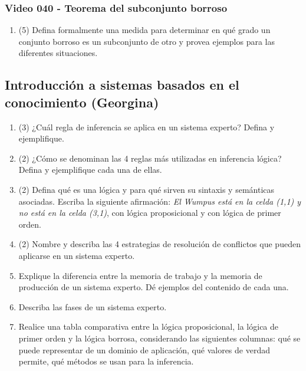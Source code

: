 \documentclass[a4paper,10pt,spanish,oneside]{article}
\begin{document}
\subsubsection{Video 040 - Teorema del subconjunto borroso}

\begin{enumerate}
\item (5) Defina formalmente una medida para determinar en qué grado un conjunto borroso es un subconjunto de otro y provea ejemplos para las diferentes situaciones.
\end{enumerate}

\newpage

\subsection{Introducción a sistemas basados en el conocimiento (Georgina)}

\begin{enumerate}
\item (3) ¿Cuál regla de inferencia se aplica en un sistema experto? Defina y ejemplifique.

\item (2) ¿Cómo se denominan las 4 reglas más utilizadas en inferencia lógica? Defina y ejemplifique cada una de ellas.

\item (2) Defina qué es una lógica y para qué sirven su sintaxis y semánticas asociadas. Escriba la siguiente afirmación: \textit{El Wumpus está en la celda (1,1) y no está en la celda (3,1)}, con lógica proposicional y con lógica de primer orden.

\item (2) Nombre y describa las 4 estrategias de resolución de conflictos que pueden aplicarse en un sistema experto.

\item Explique la diferencia entre la memoria de trabajo y la memoria de producción de un sistema experto. Dé ejemplos del contenido de cada una.

\item Describa las fases de un sistema experto.

\item Realice una tabla comparativa entre la lógica proposicional, la lógica de primer orden y la lógica borrosa, considerando las siguientes columnas: qué se puede representar de un dominio de aplicación, qué valores de verdad permite, qué métodos se usan para la inferencia.
\end{enumerate}
\end{document}
